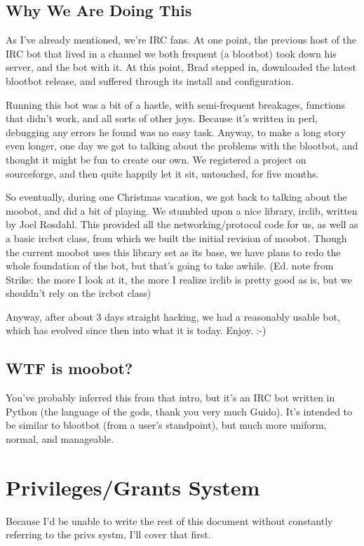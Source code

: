 \documentclass[titlepage]{article}
\begin{document}
		\subsection{Why We Are Doing This}
			As I've already mentioned, we're IRC fans.  At one point, the
			previous host of the IRC bot that lived in a channel we both
			frequent (a blootbot) took down his server, and the bot with it.
			At this point, Brad stepped in, downloaded the latest blootbot
			release, and suffered through its install and configuration.  
			
			Running this bot was a bit of a hastle, with semi-frequent
			breakages, functions that didn't work, and all sorts of other
			joys.  Because it's written in perl, debugging any errors he found
			was no easy task.  Anyway, to make a long story even longer, one
			day we got to talking about the problems with the blootbot, and
			thought it might be fun to create our own.  We registered a
			project on sourceforge, and then quite happily let it sit,
			untouched, for five months.

			So eventually, during one Christmas vacation, we got back to
			talking about the moobot, and did a bit of playing.  We stumbled
			upon a nice library, irclib, written by Joel Rosdahl.  This
			provided all the networking/protocol code for us, as well as a
			basic ircbot class, from which we built the initial revision of
			moobot.  Though the current moobot uses this library set as its
			base, we have plans to redo the whole foundation of the bot, but
			that's going to take awhile. (Ed. note from Strike:  the more I
			look at it, the more I realize irclib is pretty good as is, but we
			shouldn't rely on the ircbot class)

			Anyway, after about 3 days straight hacking, we had a reasonably
			usable bot, which has evolved since then into what it is today.
			Enjoy. :-)
		\subsection{WTF is moobot?}
			You've probably inferred this from that intro, but it's an IRC bot
			written in Python (the language of the gods, thank you very much
			Guido).  It's intended to be similar to blootbot (from a user's
			standpoint), but much more uniform, normal, and manageable.

	\section{Privileges/Grants System}
		Because I'd be unable to write the rest of this document without
		constantly referring to the privs systm, I'll cover that first.
\end{document}
